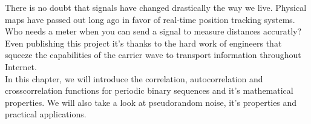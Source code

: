 There is no doubt that signals have changed drastically the way we live.
Physical maps have passed out long ago in favor of real-time position tracking
systems. Who needs a meter when you can send a signal to measure distances
accuratly? Even publishing this project it's thanks to the hard work of
engineers that squeeze the capabilities of the carrier wave to transport
information throughout Internet. \\

In this chapter, we will introduce the correlation, autocorrelation and
crosscorrelation functions for periodic binary sequences and it's mathematical
properties. We will also take a look at pseudorandom noise, it's properties and
practical applications.

 
